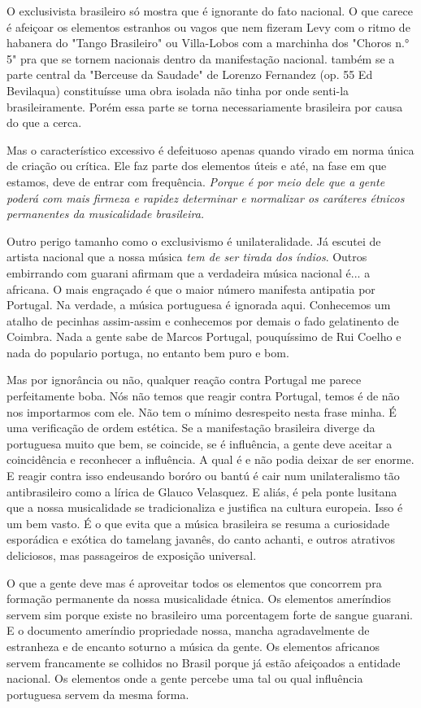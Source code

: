 O exclusivista brasileiro só mostra que é ignorante do fato nacional. O
que carece é afeiçoar os elementos estranhos ou vagos que nem fizeram
Levy com o ritmo de habanera do "Tango Brasileiro" ou Villa-Lobos com a
marchinha dos "Choros n.° 5" pra que se tornem nacionais dentro da
manifestação nacional. também se a parte central da "Berceuse da
Saudade" de Lorenzo Fernandez (op. 55 Ed Bevilaqua) constituísse uma
obra isolada não tinha por onde senti-la brasileiramente. Porém essa
parte se torna necessariamente brasileira por causa do que a cerca.

Mas o característico excessivo é defeituoso apenas quando virado em
norma única de criação ou crítica. Ele faz parte dos elementos úteis e
até, na fase em que estamos, deve de entrar com frequência. \emph{Porque
é por meio dele que a gente poderá com mais firmeza e rapidez determinar
e normalizar os caráteres étnicos permanentes da musicalidade
brasileira.}~

Outro perigo tamanho como o exclusivismo é unilateralidade. Já escutei
de artista nacional que a nossa música \emph{tem de ser tirada dos
índios}. Outros embirrando com guarani afirmam que a verdadeira música
nacional é... a africana. O mais engraçado é que o maior número
manifesta antipatia por Portugal. Na verdade, a música portuguesa é
ignorada aqui. Conhecemos um atalho de pecinhas assim-assim e conhecemos
por demais o fado gelatinento de Coimbra. Nada a gente sabe de Marcos
Portugal, pouquíssimo de Rui Coelho e nada do populario portuga, no
entanto bem puro e bom.~

Mas por ignorância ou não, qualquer reação contra Portugal me parece
perfeitamente boba. Nós não temos que reagir contra Portugal, temos é de
não nos importarmos com ele. Não tem o mínimo desrespeito nesta frase
minha. É uma verificação de ordem estética. Se a manifestação brasileira
diverge da portuguesa muito que bem, se coincide, se é influência, a
gente deve aceitar a coincidência e reconhecer a influência. A qual é e
não podia deixar de ser enorme. E reagir contra isso endeusando boróro
ou bantú é cair num unilateralismo tão antibrasileiro como a lírica de
Glauco Velasquez. E aliás, é pela ponte lusitana que a nossa
musicalidade se tradicionaliza e justifica na cultura europeia. Isso é
um bem vasto. É o que evita que a música brasileira se resuma a
curiosidade esporádica e exótica do tamelang javanês, do canto achanti,
e outros atrativos deliciosos, mas passageiros de exposição universal.~

O que a gente deve mas é aproveitar todos os elementos que concorrem pra
formação permanente da nossa musicalidade étnica. Os elementos
ameríndios servem sim porque existe no brasileiro uma porcentagem forte
de sangue guarani. E o documento ameríndio propriedade nossa, mancha
agradavelmente de estranheza e de encanto soturno a música da gente. Os
elementos africanos servem francamente se colhidos no Brasil porque já
estão afeiçoados a entidade nacional. Os elementos onde a gente percebe
uma tal ou qual influência portuguesa servem da mesma forma.

